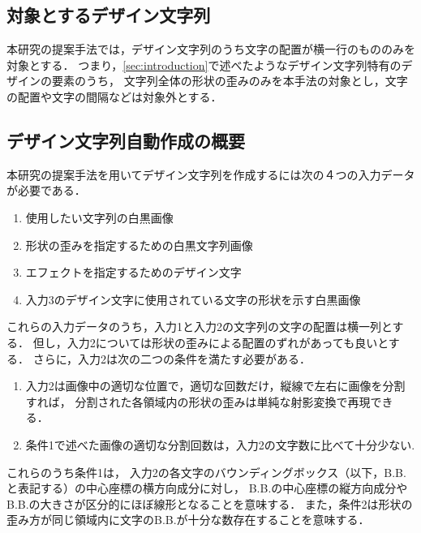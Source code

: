 \documentclass[autodetect-engine,dvi=dvipdfmx,ja=standard,a4j,jbase=10.5pt,twoside,twocolumn,magstyle=nomag*]{bxjsarticle}
\begin{document}
\subsection{対象とするデザイン文字列}
本研究の提案手法では，デザイン文字列のうち文字の配置が横一行のもののみを対象とする．
つまり，\cref{sec:introduction}で述べたようなデザイン文字列特有のデザインの要素のうち，
文字列全体の形状の歪みのみを本手法の対象とし，文字の配置や文字の間隔などは対象外とする．

\subsection{デザイン文字列自動作成の概要}
本研究の提案手法を用いてデザイン文字列を作成するには次の４つの入力データが必要である．

\begin{enumerate}
    \item 使用したい文字列の白黒画像
    \item 形状の歪みを指定するための白黒文字列画像
    \item エフェクトを指定するためのデザイン文字
    \item 入力3のデザイン文字に使用されている文字の形状を示す白黒画像
\end{enumerate}

これらの入力データのうち，入力1と入力2の文字列の文字の配置は横一列とする．
但し，入力2については形状の歪みによる配置のずれがあっても良いとする．
さらに，入力2は次の二つの条件を満たす必要がある．
\begin{enumerate}[label=\textbf{条件\arabic*:}]
    \item 入力2は画像中の適切な位置で，適切な回数だけ，縦線で左右に画像を分割すれば，
          分割された各領域内の形状の歪みは単純な射影変換で再現できる．
    \item 条件1で述べた画像の適切な分割回数は，入力2の文字数に比べて十分少ない.
\end{enumerate}
これらのうち条件1は，
入力2の各文字のバウンディングボックス（以下，B.B.と表記する）の中心座標の横方向成分に対し，
B.B.の中心座標の縦方向成分やB.B.の大きさが区分的にほぼ線形となることを意味する．
また，条件2は形状の歪み方が同じ領域内に文字のB.B.が十分な数存在することを意味する．
\end{document}
